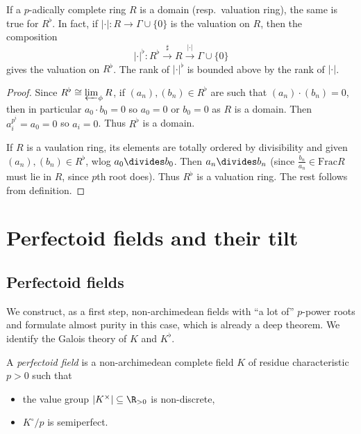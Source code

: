 \documentclass[a4paper]{article}
\newcommand{\tilt}{\flat} %
\begin{document}
\begin{lemma}
  If a \(p\)-adically complete ring \(R\) is a domain (resp.\ valuation ring), the same is true for \(R^\tilt\). In fact, if \(|\cdot|: R \to \Gamma \cup \{0\}\) is the valuation on \(R\), then the composition
  \[
    |\cdot|^\tilt: R^{\tilt} \xrightarrow{\sharp} R \xrightarrow{|\cdot|} \Gamma \cup \{0\}
  \]
  gives the valuation on \(R^\tilt\). The rank of \(|\cdot|^\tilt\) is bounded above by the rank of \(|\cdot|\).
\end{lemma}

\begin{proof}
  Since \(R^\tilt \cong \varprojlim_\phi R\), if \((a_n), (b_n) \in R^\tilt\) are such that \((a_n) \cdot (b_n) = 0\), then in particular \(a_0 \cdot b_0 = 0\) so \(a_0 = 0\) or \(b_0 = 0\) as \(R\) is a domain. Then \(a_i^{p^i} = a_0 = 0\) so \(a_i = 0\). Thus \(R^\tilt\) is a domain.

  If \(R\) is a vaulation ring, its elements are totally ordered by divisibility and given \((a_n), (b_n) \in R^\tilt\), wlog \(a_0 \divides b_0\). Then \(a_n \divides b_n\) (since \(\frac{b_n}{a_n} \in \mathrm{Frac} R\) must lie in \(R\), since \(p\)th root does). Thus \(R^\tilt\) is a valuation ring. The rest follows from definition.
\end{proof}

\section{Perfectoid fields and their tilt}

\subsection{Perfectoid fields}

We construct, as a first step, non-archimedean fields with ``a lot of'' \(p\)-power roots and formulate almost purity in this case, which is already a deep theorem. We identify the Galois theory of \(K\) and \(K^\tilt\).

\begin{definition}
  A \emph{perfectoid field} is a non-archimedean complete field \(K\) of residue characteristic \(p > 0\) such that
  \begin{itemize}
  \item the value group \(|K^\times| \subseteq \R_{> 0}\) is non-discrete,
  \item \(K^\circ/p\) is semiperfect.
  \end{itemize}
\end{definition}
\end{document}
